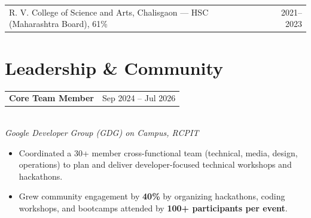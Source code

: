 \documentclass[9pt]{extarticle}
\makeatletter
\newcommand{\entryheader}[2]{%
  \noindent\begin{tabularx}{\linewidth}{@{}X r@{}}
    \textbf{#1} & #2
  \end{tabularx}%
}
\newcommand{\normalentryheader}[2]{%
\noindent\begin{tabularx}{\linewidth}{@{}X r@{}}
#1 & #2
\end{tabularx}%
}
\makeatother
\begin{document}
\normalentryheader{R. V. College of Science and Arts, Chalisgaon --- HSC (Maharashtra Board), 61\%}{2021--2023}



\section*{Leadership \& Community}

\entryheader{Core Team Member}{Sep 2024 -- Jul 2026}\\
\textit{\small Google Developer Group (GDG) on Campus, RCPIT}
\begin{itemize}
  \item Coordinated a 30+ member cross-functional team (technical, media, design, operations) to plan and deliver developer-focused technical workshops and hackathons.
  \item Grew community engagement by \textbf{40\%} by organizing hackathons, coding workshops, and bootcamps attended by \textbf{100+ participants per event}.
\end{itemize}
\end{document}
